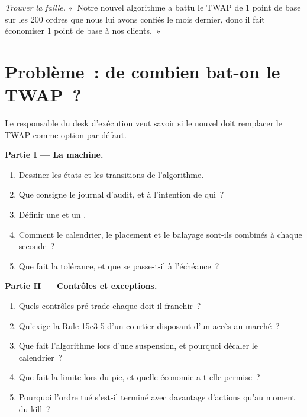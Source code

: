 \begin{exercise}[$\star\star\star$]\label{exo:mx:build-an-execution-algorithm:8}
\emph{Trouver la faille.} «~Notre nouvel algorithme a battu le TWAP de 1 point de base sur les 200 ordres que nous lui avons confiés le mois dernier, donc il fait économiser 1 point de base à nos clients.~»
\end{exercise}

\section{Problème~: de combien bat-on le TWAP~?}

\begin{problem}\label{pb:mx:build-an-execution-algorithm:1}
Le responsable du desk d'exécution veut savoir si le nouvel  doit remplacer le TWAP comme option par défaut.

\medskip\noindent\textbf{Partie I --- La machine.}
\begin{enumerate}
\item Dessiner les états et les transitions de l'algorithme.
\item Que consigne le journal d'audit, et à l'intention de qui~?
\item Définir une  et un .
\item Comment le calendrier, le placement et le balayage sont-ils combinés à chaque seconde~?
\item Que fait la tolérance, et que se passe-t-il à l'échéance~?
\end{enumerate}

\medskip\noindent\textbf{Partie II --- Contrôles et exceptions.}
\begin{enumerate}[resume]
\item Quels contrôles pré-trade chaque  doit-il franchir~?
\item Qu'exige la Rule 15c3-5 d'un courtier disposant d'un accès au marché~?
\item Que fait l'algorithme lors d'une suspension, et pourquoi décaler le calendrier~?
\item Que fait la limite lors du pic, et quelle économie a-t-elle permise~?
\item Pourquoi l'ordre tué s'est-il terminé avec davantage d'actions qu'au moment du kill~?
\end{enumerate}


\end{problem}
